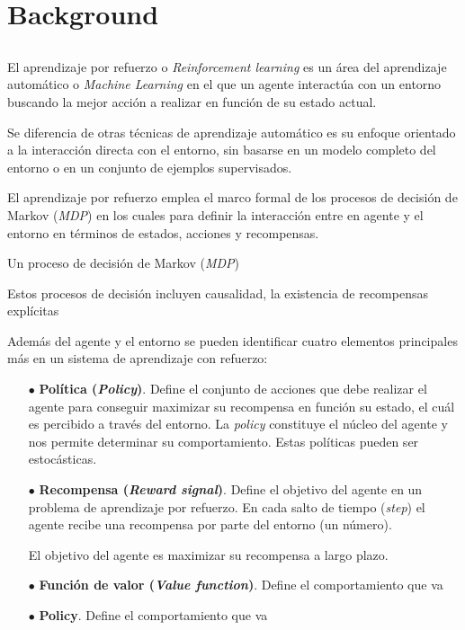 \chapter{Background}

\section{}

El aprendizaje por refuerzo o \textit{Reinforcement learning} \cite{sutton2018reinforcement} es un área del aprendizaje 
automático o \textit{Machine Learning} en el que un agente interactúa con un entorno buscando la mejor acción a realizar en función de su estado actual.

Se diferencia de otras técnicas de aprendizaje automático es su enfoque orientado a la interacción directa con el entorno, sin basarse en un modelo completo del entorno o en un conjunto de ejemplos supervisados.

El aprendizaje por refuerzo emplea el marco formal de los procesos de decisión de Markov (\textit{MDP}) en los cuales para definir la interacción entre en agente y el entorno en términos de estados, acciones y recompensas.

Un proceso de decisión de Markov (\textit{MDP})



 Estos procesos de decisión incluyen causalidad, la existencia de recompensas explícitas 

Además del agente y el entorno se pueden identificar cuatro elementos principales más en un sistema de aprendizaje con refuerzo:

\begin{itemize}
	\item[$\bullet$] \textbf{Política (\textit{Policy})}. Define el conjunto de acciones que debe realizar el agente para conseguir maximizar su recompensa en función su estado, el cuál es percibido a través del entorno. La \textit{policy} constituye el núcleo del agente y nos permite determinar su comportamiento. Estas políticas pueden ser estocásticas.
	
	\item[$\bullet$] \textbf{Recompensa (\textit{Reward signal})}. 
	Define el objetivo del agente en un problema de aprendizaje por refuerzo. En cada salto de tiempo (\textit{step}) el agente recibe una recompensa por parte del entorno (un número). 
	
	El objetivo del agente es maximizar su recompensa a largo plazo.
	
	\item[$\bullet$] \textbf{Función de valor (\textit{Value function})}. Define el comportamiento que va 
	
	\item[$\bullet$] \textbf{Policy}. Define el comportamiento que va 
	
\end{itemize}